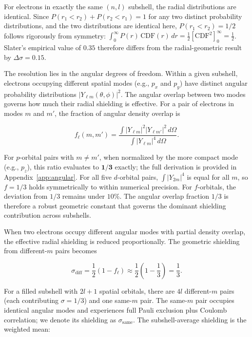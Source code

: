 \documentclass[11pt,a4paper]{article}
\begin{document}
For electrons in exactly the same $(n,l)$ subshell, the radial distributions are identical. Since $P(r_1 < r_2) + P(r_2 < r_1) = 1$ for any two distinct probability distributions, and the two distributions are identical here, $P(r_1 < r_2) = 1/2$ follows rigorously from symmetry: $\int_0^\infty P(r)\,\mathrm{CDF}(r)\,dr = \frac{1}{2}[\mathrm{CDF}^2]_0^\infty = \frac{1}{2}$. Slater's empirical value of $0.35$ therefore differs from the radial-geometric result by $\Delta\sigma = 0.15$.

The resolution lies in the angular degrees of freedom. Within a given subshell, electrons occupying different spatial modes (e.g., $p_x$ and $p_y$) have distinct angular probability distributions $|Y_{\ell m}(\theta,\phi)|^2$. The angular overlap between two modes governs how much their radial shielding is effective. For a pair of electrons in modes $m$ and $m'$, the fraction of angular density overlap is

\begin{equation}\label{eq:f_diff}
f_\ell(m,m') = \frac{\int |Y_{\ell m}|^2 |Y_{\ell m'}|^2 \, d\Omega}
                     {\int |Y_{\ell m}|^4 \, d\Omega}.
\end{equation}

For $p$-orbital pairs with $m \neq m'$, when normalized by the more compact mode (e.g., $p_z$), this ratio evaluates to $\mathbf{1/3}$ exactly; the full derivation is provided in Appendix~\ref{app:angular}. For all five $d$-orbital pairs, $\int |Y_{2m}|^4$ is equal for all $m$, so $f = 1/3$ holds symmetrically to within numerical precision. For $f$-orbitals, the deviation from $1/3$ remains under $10$\%. The angular overlap fraction $1/3$ is therefore a robust geometric constant that governs the dominant shielding contribution across subshells.

When two electrons occupy different angular modes with partial density overlap, the effective radial shielding is reduced proportionally. The geometric shielding from different-$m$ pairs becomes

\begin{equation}\label{eq:sigma_diff}
\sigma_{\mathrm{diff}} = \frac{1}{2}\left(1 - f_\ell\right) \approx \frac{1}{2}\left(1 - \frac{1}{3}\right) = \frac{1}{3}.
\end{equation}

For a filled subshell with $2l+1$ spatial orbitals, there are $4l$ different-$m$ pairs (each contributing $\sigma = 1/3$) and one same-$m$ pair. The same-$m$ pair occupies identical angular modes and experiences full Pauli exclusion plus Coulomb correlation; we denote its shielding as $\sigma_{\mathrm{same}}$. The subshell-average shielding is the weighted mean:
\end{document}
